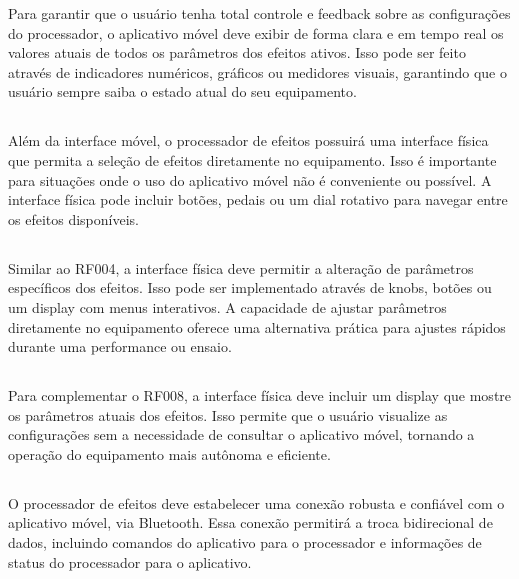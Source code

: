 Para garantir que o usuário tenha total controle e feedback sobre as configurações do processador, o aplicativo móvel deve exibir de forma clara e em tempo real os valores atuais de todos os parâmetros dos efeitos ativos. Isso pode ser feito através de indicadores numéricos, gráficos ou medidores visuais, garantindo que o usuário sempre saiba o estado atual do seu equipamento.

\subsection{}

Além da interface móvel, o processador de efeitos possuirá uma interface física que permita a seleção de efeitos diretamente no equipamento. Isso é importante para situações onde o uso do aplicativo móvel não é conveniente ou possível. A interface física pode incluir botões, pedais ou um dial rotativo para navegar entre os efeitos disponíveis.

\subsection{}

Similar ao RF004, a interface física deve permitir a alteração de parâmetros específicos dos efeitos. Isso pode ser implementado através de knobs, botões ou um display com menus interativos. A capacidade de ajustar parâmetros diretamente no equipamento oferece uma alternativa prática para ajustes rápidos durante uma performance ou ensaio.

\subsection{}

Para complementar o RF008, a interface física deve incluir um display  que mostre os parâmetros atuais dos efeitos. Isso permite que o usuário visualize as configurações sem a necessidade de consultar o aplicativo móvel, tornando a operação do equipamento mais autônoma e eficiente.

\subsection{}

O processador de efeitos deve estabelecer uma conexão robusta e confiável com o aplicativo móvel, via Bluetooth. Essa conexão permitirá a troca bidirecional de dados, incluindo comandos do aplicativo para o processador e informações de status do processador para o aplicativo. 


